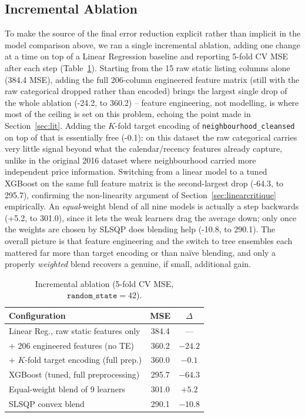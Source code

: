 \documentclass[journal]{IEEEtran}
\begin{document}
\subsection{Incremental Ablation}
\label{sec:ablation}
To make the source of the final error reduction explicit rather than implicit
in the model comparison above, we ran a single incremental ablation, adding one
change at a time on top of a Linear Regression baseline and reporting 5-fold CV
MSE after each step (Table~\ref{tab:ablation}). Starting from the 15 raw static
listing columns alone (384.4 MSE), adding the full 206-column engineered
feature matrix (still with the raw categorical dropped rather than encoded)
brings the largest single drop of the whole ablation (-24.2, to 360.2) --
feature engineering, not modelling, is where most of the ceiling is set on this
problem, echoing the point made in Section~\ref{sec:lit}. Adding the $K$-fold
target encoding of \texttt{neighbourhood\_cleansed} on top of that is
essentially free (-0.1): on this dataset the raw categorical carries very
little signal beyond what the calendar/recency features already capture, unlike
in the original 2016 dataset where neighbourhood carried more independent
price information. Switching from a linear model to a tuned XGBoost on the same
full feature matrix is the second-largest drop (-64.3, to 295.7), confirming
the non-linearity argument of Section~\ref{sec:linearcritique} empirically. An
\emph{equal}-weight blend of all nine models is actually a step backwards
(+5.2, to 301.0), since it lets the weak learners drag the average down; only
once the weights are chosen by SLSQP does blending help (-10.8, to 290.1). The
overall picture is that feature engineering and the switch to tree ensembles
each mattered far more than target encoding or than na\"ive blending, and only
a properly \emph{weighted} blend recovers a genuine, if small, additional gain.

\begin{table}[!t]
\caption{Incremental ablation (5-fold CV MSE, $\mathtt{random\_state}=42$).}
\label{tab:ablation}
\centering
\small
\begin{tabular}{lcc}
\toprule
Configuration & MSE & $\Delta$ \\
\midrule
Linear Reg., raw static features only & 384.4 & --- \\
\quad + 206 engineered features (no TE) & 360.2 & $-24.2$ \\
\quad + $K$-fold target encoding (full prep.) & 360.0 & $-0.1$ \\
XGBoost (tuned, full preprocessing) & 295.7 & $-64.3$ \\
\quad Equal-weight blend of 9 learners & 301.0 & $+5.2$ \\
\quad SLSQP convex blend & 290.1 & $-10.8$ \\
\bottomrule
\end{tabular}
\end{table}
\end{document}
